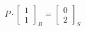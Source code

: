 \documentclass[preview]{standalone}
\begin{document}
\begin{align*}
P \cdot \begin{bmatrix} 1 \\ 1 \end{bmatrix}_B = \begin{bmatrix} 0 \\ 2 \end{bmatrix}_S
\end{align*}
\end{document}
